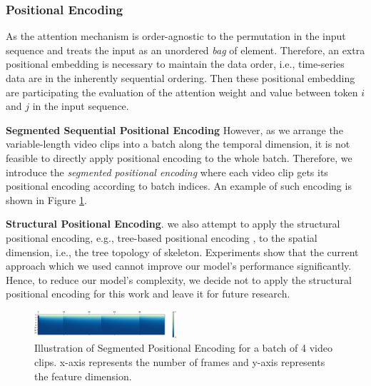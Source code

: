 \documentclass[letterpaper]{article} %
\begin{document}
\subsubsection{Positional Encoding} \label{sec:pos_enc}
As the attention mechanism is order-agnostic to the permutation in the input sequence \cite{attn2017all, tsai2019TransformerDissection} and treats the input as an unordered \textit{bag} of element. Therefore, an extra positional embedding is necessary to maintain the data order, i.e., time-series data are in the inherently sequential ordering. Then these positional embedding are participating the evaluation of the attention weight and value between token $i$ and $j$ in the input sequence.

\textbf{Segmented Sequential Positional Encoding}
However, as we arrange the variable-length video clips into a batch along the temporal dimension, it is not feasible to directly apply positional encoding to the whole batch. Therefore, we introduce the \textit{segmented positional encoding} where each video clip gets its positional encoding according to batch indices. An example of such encoding is shown in Figure \ref{fig:sgm_pos_enc}.

\textbf{Structural Positional Encoding}. we also attempt to apply the structural positional encoding, e.g., tree-based positional encoding \cite{neurips2019treepositional, omote-etal-2019-dependency}, to the spatial dimension, i.e., the tree topology of skeleton. Experiments show that the current approach which we used cannot improve our model's performance significantly. Hence, to reduce our model's complexity, we decide not to apply the structural positional encoding for this work and leave it for future research.

\begin{figure}[ht]
    \centering
    \includegraphics[width=0.47\textwidth]{sgm_pos_enc.pdf}
    \caption{Illustration of Segmented Positional Encoding for a batch of 4 video clips. x-axis represents the number of frames and y-axis represents the feature dimension.}
    \label{fig:sgm_pos_enc}
\end{figure}
\end{document}
